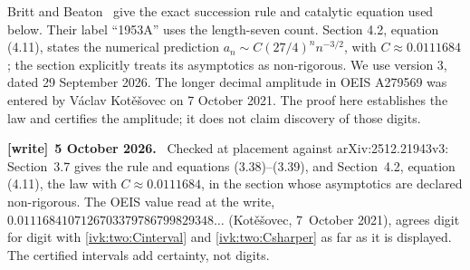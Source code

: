 \documentclass[11pt,letterpaper]{article}
\theoremstyle{remark}\newtheorem{remark}[theorem]{Remark}
\newenvironment{writenote}[1][]{\par\smallskip\begingroup\small
 \noindent\textbf{[write]}\if\relax\detokenize{#1}\relax\else~\textbf{#1.}\fi\ }%
 {\par\endgroup\smallskip}
\begin{document}
Britt and Beaton~\cite[Section 3.7, equations (3.38)--(3.39)]{bb}
give the exact succession rule and catalytic equation used below.
Their label ``1953A'' uses the length-seven count. Section 4.2,
equation (4.11), states the numerical prediction
$a_n\sim C(27/4)^n n^{-3/2}$, with $C\approx0.0111684$; the section
explicitly treats its asymptotics as non-rigorous. We use version 3,
dated 29 September 2026. The longer decimal amplitude in
OEIS A279569 was entered by V\'aclav Kot\v e\v sovec on 7 October 2021.
The proof here establishes the law and certifies the amplitude;
it does not claim discovery of those digits.
\begin{writenote}[5 October 2026]
Checked at placement against arXiv:2512.21943v3: Section~3.7 gives the rule and equations (3.38)--(3.39), and Section~4.2, equation (4.11), the law with $C\approx0.0111684$, in the section whose asymptotics are declared non-rigorous. The OEIS value read at the write, $0.0111684107126703379786799829348\ldots$ (Kot\v{e}\v{s}ovec, 7~October 2021), agrees digit for digit with \eqref{ivk:two:Cinterval} and \eqref{ivk:two:Csharper} as far as it is displayed. The certified intervals add certainty, not digits.
\end{writenote}
\end{document}
